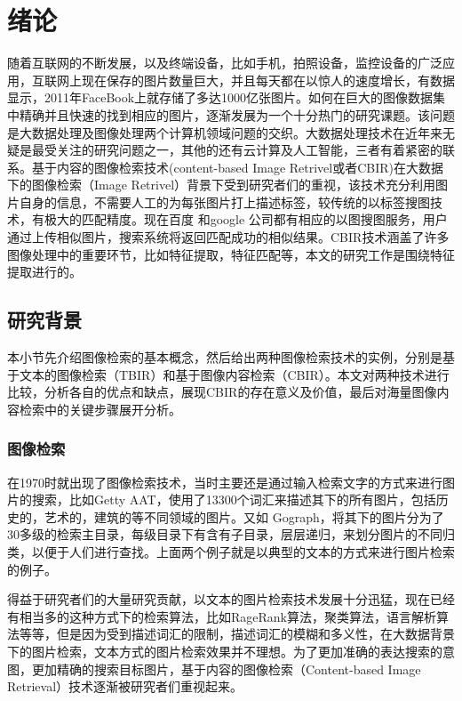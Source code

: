 ﻿\chapter{绪论}

随着互联网的不断发展，以及终端设备，比如手机，拍照设备，监控设备的广泛应用，互联网上现在保存的图片数量巨大，并且每天都在以惊人的速度增长，有数据显示，2011年FaceBook上就存储了多达1000亿张图片。如何在巨大的图像数据集中精确并且快速的找到相应的图片，逐渐发展为一个十分热门的研究课题。该问题是大数据处理及图像处理两个计算机领域问题的交织。大数据处理技术在近年来无疑是最受关注的研究问题之一，其他的还有云计算及人工智能，三者有着紧密的联系。基于内容的图像检索技术(content-based Image Retrivel或者CBIR)在大数据下的图像检索（Image Retrivel）背景下受到研究者们的重视，该技术充分利用图片自身的信息，不需要人工的为每张图片打上描述标签，较传统的以标签搜图技术，有极大的匹配精度。现在百度 和google 公司都有相应的以图搜图服务，用户通过上传相似图片，搜索系统将返回匹配成功的相似结果。CBIR技术涵盖了许多图像处理中的重要环节，比如特征提取，特征匹配等，本文的研究工作是围绕特征提取进行的。

\section{研究背景}
本小节先介绍图像检索的基本概念，然后给出两种图像检索技术的实例，分别是基于文本的图像检索（TBIR）和基于图像内容检索（CBIR）。本文对两种技术进行比较，分析各自的优点和缺点，展现CBIR的存在意义及价值，最后对海量图像内容检索中的关键步骤展开分析。

\subsection{图像检索}
在1970时就出现了图像检索技术，当时主要还是通过输入检索文字的方式来进行图片的搜索，比如Getty AAT，使用了13300个词汇来描述其下的所有图片，包括历史的，艺术的，建筑的等不同领域的图片。又如 Gograph，将其下的图片分为了30多级的检索主目录，每级目录下有含有子目录，层层递归，来划分图片的不同归类，以便于人们进行查找。上面两个例子就是以典型的文本的方式来进行图片检索的例子。

得益于研究者们的大量研究贡献，以文本的图片检索技术发展十分迅猛，现在已经有相当多的这种方式下的检索算法，比如RageRank算法，聚类算法，语言解析算法等等，但是因为受到描述词汇的限制，描述词汇的模糊和多义性，在大数据背景下的图片检索，文本方式的图片检索效果并不理想。为了更加准确的表达搜索的意图，更加精确的搜索目标图片，基于内容的图像检索（Content-based Image Retrieval）技术逐渐被研究者们重视起来。

